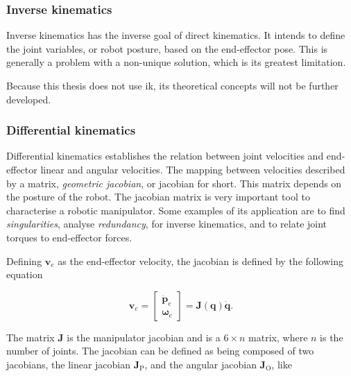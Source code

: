 
\subsubsection{Inverse kinematics}
\label{subsubsec:inverse_kinematics}

Inverse kinematics has the inverse goal of direct kinematics. It intends to define the joint variables, or robot posture, based on the end-effector pose. This is generally a problem with a non-unique solution, which is its greatest limitation.

Because this thesis does not use \gls{ik}, its theoretical concepts will not be further developed.


\subsubsection{Differential kinematics}
\label{subsubsec:differential_kinematics}

Differential kinematics establishes the relation between joint velocities and end-effector linear and angular velocities. The mapping between velocities described by a matrix, \emph{geometric jacobian}, or jacobian for short. This matrix depends on the posture of the robot. The jacobian matrix is very important tool to characterise a robotic manipulator. Some examples of its application are to find \emph{singularities}, analyse \emph{redundancy}, for inverse kinematics, and to relate joint torques to end-effector forces.

Defining $\boldsymbol{v}_e$ as the end-effector velocity, the jacobian is defined by the following equation

\begin{equation}
    \boldsymbol{v}_e = \begin{bmatrix}
    \dot{\boldsymbol{p}}_e\\
    \boldsymbol{\omega}_e
    \end{bmatrix} = \boldsymbol{J}(\boldsymbol{q})\dot{\boldsymbol{q}}.
\end{equation}

The matrix $\boldsymbol{J}$ is the manipulator jacobian and is a $6 \times n$ matrix, where $n$ is the number of joints. The jacobian can be defined as being composed of two jacobians, the linear jacobian $\boldsymbol{J}_\text{P}$, and the angular jacobian $\boldsymbol{J}_\text{O}$, like

